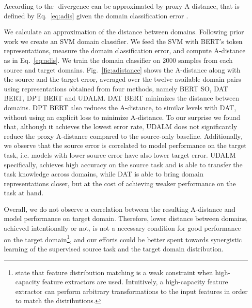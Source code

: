 \documentclass[11pt]{article}
\begin{document}
According to \citet{ben2007analysis} the -divergence can be approximated by proxy A-distance, that is defined by Eq.~\ref{eq:adis} given the domain classification error . 


We calculate an approximation of the distance between domains. Following prior work \citep{ganin2016domain, saito2017asymmetric} we create an SVM domain classifier. 
We feed the SVM with BERT's  token representations, measure the domain classification error, and compute A-distance as in Eq.~\ref{eq:adis}. 
We train the domain classifier on 2000 samples from each source and target domains. 
Fig.~\ref{fig:adistance} shows the A-distance along with the source and the target error, averaged over the twelve available domain pairs using representations obtained from four methods, namely BERT SO, DAT BERT, DPT BERT and UDALM.
DAT BERT minimizes the distance between domains.
DPT BERT also reduces the A-distance, to similar levels with DAT, without using an explicit loss to minimize A-distance.
To our surprise we found that, although it achieves the lowest error rate, UDALM does not significantly reduce the proxy A-distance compared to the source-only baseline.
Additionally, we observe that the source error is correlated to model performance on the target task, i.e. models with lower source error have also lower target error.
UDALM specifically, achieves high accuracy on the source task and is able to transfer the task knowledge across domains, while DAT is able to bring domain representations closer, but at the cost of achieving weaker performance on the task at hand.

Overall, we do not observe a correlation between the resulting A-distance and model performance on target domain.
Therefore, lower distance between domains, achieved intentionally or not, is not a necessary condition for good performance on the target domain\footnote{\citet{shu2018dirt} state that feature distribution matching is a weak constraint when high-capacity feature extractors are used. Intuitively, a high-capacity feature extractor can perform arbitrary transformations to the input features in order to match the distributions.}, and our efforts could be better spent towards synergistic learning of the supervised source task and the target domain distribution.
\end{document}
